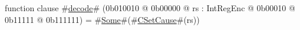 function clause #\hyperref[zdecode]{decode}# (0b010010 @ 0b00000 @ rs : IntRegEnc @    0b00010 @    0b11111 @ 0b111111) = #\hyperref[zSome]{Some}#(#\hyperref[zCSetCause]{CSetCause}#(rs))
